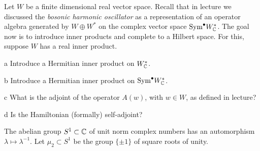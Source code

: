 \documentclass{pset}
\begin{document}
\begin{problem}{4}
  Let $W$ be a finite dimensional real vector space. Recall that in lecture we discussed the \emph{bosonic harmonic oscillator} as a representation of an operator algebra generated by $W\oplus W^*$ on the complex vector space $\mathrm{Sym}^\bullet W_{\mathbb{C}}^*$. The goal now is to introduce inner products and complete to a Hilbert space. For this, suppose $W$ has a real inner product.
\end{problem}

\begin{parts}
  \begin{part}{a}
    Introduce a Hermitian inner product on $W^*_{\mathbb{C}}$.
  \end{part}

  \begin{part}{b}
    Introduce a Hermitian inner product on $\mathrm{Sym}^\bullet W^*_{\mathbb{C}}$.
  \end{part}

  \begin{part}{c}
    What is the adjoint of the operator $A(w)$, with $w\in W$, as defined in lecture?
  \end{part}

  \begin{part}{d}
    Is the Hamiltonian (formally) self-adjoint?
  \end{part}
\end{parts}

\begin{problem}{5}
  The abelian group $S^1 \subset \mathbb{C}$ of unit norm complex numbers has an automorphism $\lambda \mapsto \lambda^{-1}$. Let $\mu_2\subset S^1$ be the group $\{\pm 1\}$ of square roots of unity.
\end{problem}
\end{document}
